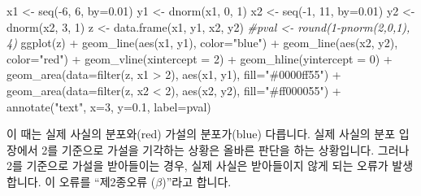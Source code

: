 \documentclass[
]{book}
\newenvironment{Shaded}{\begin{snugshade}}{\end{snugshade}}
\newcommand{\AttributeTok}[1]{\textcolor[rgb]{0.77,0.63,0.00}{#1}}
\newcommand{\CommentTok}[1]{\textcolor[rgb]{0.56,0.35,0.01}{\textit{#1}}}
\newcommand{\DecValTok}[1]{\textcolor[rgb]{0.00,0.00,0.81}{#1}}
\newcommand{\FloatTok}[1]{\textcolor[rgb]{0.00,0.00,0.81}{#1}}
\newcommand{\FunctionTok}[1]{\textcolor[rgb]{0.00,0.00,0.00}{#1}}
\newcommand{\NormalTok}[1]{#1}
\newcommand{\OtherTok}[1]{\textcolor[rgb]{0.56,0.35,0.01}{#1}}
\newcommand{\SpecialCharTok}[1]{\textcolor[rgb]{0.00,0.00,0.00}{#1}}
\newcommand{\StringTok}[1]{\textcolor[rgb]{0.31,0.60,0.02}{#1}}
\begin{document}
\begin{Shaded}
\begin{Highlighting}[]

\NormalTok{x1 }\OtherTok{\textless{}{-}} \FunctionTok{seq}\NormalTok{(}\SpecialCharTok{{-}}\DecValTok{6}\NormalTok{, }\DecValTok{6}\NormalTok{, }\AttributeTok{by=}\FloatTok{0.01}\NormalTok{)}
\NormalTok{y1 }\OtherTok{\textless{}{-}} \FunctionTok{dnorm}\NormalTok{(x1, }\DecValTok{0}\NormalTok{, }\DecValTok{1}\NormalTok{)}
\NormalTok{x2 }\OtherTok{\textless{}{-}} \FunctionTok{seq}\NormalTok{(}\SpecialCharTok{{-}}\DecValTok{1}\NormalTok{, }\DecValTok{11}\NormalTok{, }\AttributeTok{by=}\FloatTok{0.01}\NormalTok{)}
\NormalTok{y2 }\OtherTok{\textless{}{-}} \FunctionTok{dnorm}\NormalTok{(x2, }\DecValTok{3}\NormalTok{, }\DecValTok{1}\NormalTok{)}
\NormalTok{z }\OtherTok{\textless{}{-}} \FunctionTok{data.frame}\NormalTok{(x1, y1, x2, y2)}
\CommentTok{\#pval \textless{}{-} round(1{-}pnorm(2,0,1), 4)}
\FunctionTok{ggplot}\NormalTok{(z) }\SpecialCharTok{+}
  \FunctionTok{geom\_line}\NormalTok{(}\FunctionTok{aes}\NormalTok{(x1, y1), }\AttributeTok{color=}\StringTok{"blue"}\NormalTok{) }\SpecialCharTok{+}
  \FunctionTok{geom\_line}\NormalTok{(}\FunctionTok{aes}\NormalTok{(x2, y2), }\AttributeTok{color=}\StringTok{"red"}\NormalTok{) }\SpecialCharTok{+}
  \FunctionTok{geom\_vline}\NormalTok{(}\AttributeTok{xintercept =} \DecValTok{2}\NormalTok{) }\SpecialCharTok{+}
  \FunctionTok{geom\_hline}\NormalTok{(}\AttributeTok{yintercept =} \DecValTok{0}\NormalTok{) }\SpecialCharTok{+}
  \FunctionTok{geom\_area}\NormalTok{(}\AttributeTok{data=}\FunctionTok{filter}\NormalTok{(z, x1 }\SpecialCharTok{\textgreater{}} \DecValTok{2}\NormalTok{), }
            \FunctionTok{aes}\NormalTok{(x1, y1), }
            \AttributeTok{fill=}\StringTok{"\#0000ff55"}\NormalTok{) }\SpecialCharTok{+}
  \FunctionTok{geom\_area}\NormalTok{(}\AttributeTok{data=}\FunctionTok{filter}\NormalTok{(z, x2 }\SpecialCharTok{\textless{}} \DecValTok{2}\NormalTok{), }
            \FunctionTok{aes}\NormalTok{(x2, y2), }
            \AttributeTok{fill=}\StringTok{"\#ff000055"}\NormalTok{) }\SpecialCharTok{+}
  \FunctionTok{annotate}\NormalTok{(}\StringTok{"text"}\NormalTok{, }\AttributeTok{x=}\DecValTok{3}\NormalTok{, }\AttributeTok{y=}\FloatTok{0.1}\NormalTok{, }\AttributeTok{label=}\NormalTok{pval) }
\end{Highlighting}
\end{Shaded}

이 때는 실제 사실의 분포와(red) 가설의 분포가(blue) 다릅니다. 실제 사실의 분포 입장에서 2를 기준으로 가설을 기각하는 상황은 올바른 판단을 하는 상황입니다. 그러나 2를 기준으로 가설을 받아들이는 경우, 실제 사실은 받아들이지 않게 되는 오류가 발생합니다. 이 오류를 ``제2종오류 (\(\beta\))''라고 합니다.
\end{document}

